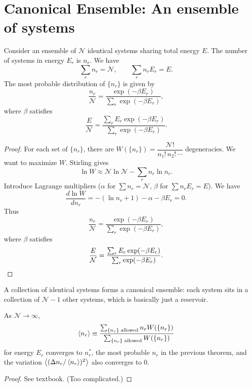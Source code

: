 \section{Canonical Ensemble: An ensemble of systems} \label{appendix:ensemble}
\begin{theorem}
Consider an ensemble of $\mathcal{N}$ identical systems sharing total energy $E$.
The number of systems in energy $E_r$ is $n_r$. We have
\[
    \sum_r n_r = \mathcal{N},\qquad \sum_r n_r E_r = E.
\]
The most probable distribution of $\{n_r\}$ is given by
\[
    \frac{n_r}{\mathcal{N}} = \frac{\exp(-\beta E_r)}{\sum_r \exp(-\beta E_r)},
\]
where $\beta$ satisfies
\[
    \frac{E}{\mathcal{N}} = \frac{\sum_r E_r \exp(-\beta E_r)}{\sum_r \exp(-\beta E_r)}.
\]
\end{theorem}

\begin{proof}
For each set of $\{n_r\}$, there are $W(\{n_r\}) = \dfrac{\mathcal{N}!}{n_1!\,n_2!\,\cdots}$ degeneracies.
We want to maximize $W$. Stirling gives
\[
    \ln W \approx \mathcal{N}\ln\mathcal{N} - \sum_r n_r \ln n_r.
\]
Introduce Lagrange multipliers ($\alpha$ for $\sum n_r = \mathcal{N}$, $\beta$ for $\sum n_r E_r = E$). We have
\[
    \frac{d\ln W}{dn_r} = -(\ln n_r + 1) - \alpha - \beta E_r = 0.
\]
Thus
\[
    \frac{n_r}{\mathcal{N}} = \frac{\exp(-\beta E_r)}{\sum_r\exp(-\beta E_r)},
\]
where $\beta$ satisfies
\[
    \frac{E}{\mathcal{N}} = \frac{\sum_r E_r \exp(-\beta E_r)}{\sum_r\exp(-\beta E_r)}. \qedhere
\]
\end{proof}

\begin{remark}
A collection of identical systems forms a canonical ensemble: each system sits in a collection of $\mathcal{N}-1$ other systems, which is basically just a reservoir.
\end{remark}

\begin{theorem}
As $\mathcal{N}\to\infty$,
\[
    \left\langle n_r \right\rangle \equiv \frac{\sum_{\{n_r\}\text{ allowed}} n_r W(\{n_r\})}{\sum_{\{n_r\}\text{ allowed}} W(\{n_r\})}
\]
for energy $E_r$ converges to $n_r^{*}$, the most probable $n_r$ in the previous theorem, and the variation
$\bigl\langle (\Delta n_r/\left\langle n_r \right\rangle)^{2}\bigr\rangle$ also converges to $0$.
\end{theorem}

\begin{proof}
See textbook. (Too complicated.)
\end{proof}